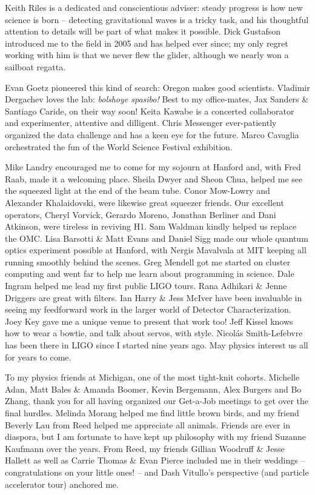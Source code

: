 \documentclass[leqno,twoside]{report}
\theoremstyle{plain}
\theoremstyle{definition}
\theoremstyle{remark}
\numberwithin{theorem}{chapter}        %
\begin{document}
Keith Riles is a dedicated and conscientious adviser: steady progress is how new science is born -- detecting gravitational waves is a tricky task, and his thoughtful attention to details will be part of what makes it possible.
Dick Gustafson introduced me to the field in 2005 and has helped ever since; my only regret working with him is that we never flew the glider, although we nearly won a sailboat regatta.

Evan Goetz pioneered this kind of search: Oregon makes good scientists.
Vladimir Dergachev loves the lab: \textit{bolshoye spasibo!}
Best to my office-mates, Jax Sanders \& Santiago Caride, on their way soon!
Keita Kawabe is a concerted collaborator and experimenter, attentive and dilligent.
Chris Messenger ever-patiently organized the data challenge and has a keen eye for the future.
Marco Cavaglia orchestrated the fun of the World Science Festival exhibition.

Mike Landry encouraged me to come for my sojourn at Hanford and, with Fred Raab, made it a welcoming place.
Sheila Dwyer and Sheon Chua, helped me see the squeezed light at the end of the beam tube.
Conor Mow-Lowry and Alexander Khalaidovski, were likewise great squeezer friends. 
Our excellent operators, Cheryl Vorvick, Gerardo Moreno, Jonathan Berliner and Dani Atkinson, were tireless in reviving H1.
Sam Waldman kindly helped us replace the OMC.
Lisa Barsotti \& Matt Evans and Daniel Sigg made our whole quantum optics experiment possible at Hanford, with Nergis Mavalvala at MIT keeping all running smoothly behind the scenes.
Greg Mendell got me started on cluster computing and went far to help me learn about programming in science.
Dale Ingram helped me lead my first public LIGO tours.
Rana Adhikari \& Jenne Driggers are great with filters.
Ian Harry \& Jess McIver have been invaluable in seeing my feedforward work in the larger world of Detector Characterization.
Joey Key gave me a unique venue to present that work too!
Jeff Kissel knows how to wear a bowtie, and talk about servos, with style.
Nicol\'{a}s Smith-Lefebvre has been there in LIGO since I started nine years ago.
May physics interest us all for years to come.

To my physics friends at Michigan, one of the most tight-knit cohorts.
Michelle Adan, Matt Bales \& Amanda Boomer, Kevin Bergemann, Alex Burgers and Bo Zhang, thank you for all having organized our Get-a-Job meetings to get over the final hurdles.
Melinda Morang helped me find little brown birds, and my friend Beverly Lau from Reed helped me appreciate all animals.
Friends are ever in diaspora, but I am fortunate to have kept up philosophy with my friend Suzanne Kaufmann over the years.
From Reed, my friends Gillian Woodruff \& Jesse Hallett as well as Carrie Thomas \& Evan Pierce included me in their weddings -- congratulations on your little ones! -- and Dash Vitullo's perspective (and particle accelerator tour) anchored me.
\end{document}
